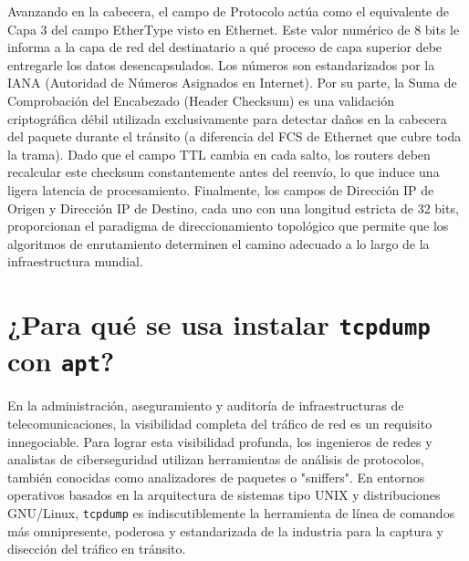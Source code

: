 \documentclass[a4paper,12pt]{article}
\begin{document}
Avanzando en la cabecera, el campo de Protocolo actúa como el equivalente de Capa 3 del campo EtherType visto en Ethernet. Este valor numérico de 8 bits le informa a la capa de red del destinatario a qué proceso de capa superior debe entregarle los datos desencapsulados. Los números son estandarizados por la IANA (Autoridad de Números Asignados en Internet). Por su parte, la Suma de Comprobación del Encabezado (Header Checksum) es una validación criptográfica débil utilizada exclusivamente para detectar daños en la cabecera del paquete durante el tránsito (a diferencia del FCS de Ethernet que cubre toda la trama). Dado que el campo TTL cambia en cada salto, los routers deben recalcular este checksum constantemente antes del reenvío, lo que induce una ligera latencia de procesamiento. Finalmente, los campos de Dirección IP de Origen y Dirección IP de Destino, cada uno con una longitud estricta de 32 bits, proporcionan el paradigma de direccionamiento topológico que permite que los algoritmos de enrutamiento determinen el camino adecuado a lo largo de la infraestructura mundial.

\section{¿Para qué se usa instalar \texttt{tcpdump} con \texttt{apt}?}

En la administración, aseguramiento y auditoría de infraestructuras de telecomunicaciones, la visibilidad completa del tráfico de red es un requisito innegociable. Para lograr esta visibilidad profunda, los ingenieros de redes y analistas de ciberseguridad utilizan herramientas de análisis de protocolos, también conocidas como analizadores de paquetes o "sniffers". En entornos operativos basados en la arquitectura de sistemas tipo UNIX y distribuciones GNU/Linux, \texttt{tcpdump} es indiscutiblemente la herramienta de línea de comandos más omnipresente, poderosa y estandarizada de la industria para la captura y disección del tráfico en tránsito. 
\end{document}
